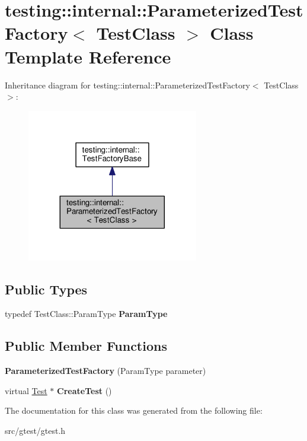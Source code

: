 \hypertarget{classtesting_1_1internal_1_1_parameterized_test_factory}{}\section{testing\+:\+:internal\+:\+:Parameterized\+Test\+Factory$<$ Test\+Class $>$ Class Template Reference}
\label{classtesting_1_1internal_1_1_parameterized_test_factory}


Inheritance diagram for testing\+:\+:internal\+:\+:Parameterized\+Test\+Factory$<$ Test\+Class $>$\+:
\nopagebreak
\begin{figure}[H]
\begin{center}
\leavevmode
\includegraphics[width=212pt]{classtesting_1_1internal_1_1_parameterized_test_factory__inherit__graph}
\end{center}
\end{figure}
\subsection*{Public Types}
\begin{DoxyCompactItemize}
\item 
\mbox{\label{classtesting_1_1internal_1_1_parameterized_test_factory_ad9a27b8e1a83de2f1687625bccff460d}} 
typedef Test\+Class\+::\+Param\+Type {\bfseries Param\+Type}
\end{DoxyCompactItemize}
\subsection*{Public Member Functions}
\begin{DoxyCompactItemize}
\item 
\mbox{\label{classtesting_1_1internal_1_1_parameterized_test_factory_a82d78356cd402224255edec760a048fb}} 
{\bfseries Parameterized\+Test\+Factory} (Param\+Type parameter)
\item 
\mbox{\label{classtesting_1_1internal_1_1_parameterized_test_factory_ae17e73e91f7fd5d49ca238c005ef4960}} 
virtual \mbox{\hyperlink{classtesting_1_1_test}{Test}} $\ast$ {\bfseries Create\+Test} ()
\end{DoxyCompactItemize}


The documentation for this class was generated from the following file\+:\begin{DoxyCompactItemize}
\item 
src/gtest/gtest.\+h\end{DoxyCompactItemize}
